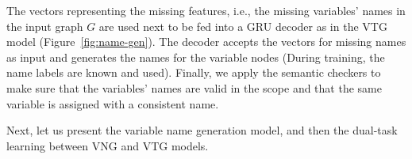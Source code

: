 The vectors representing the missing features, i.e., the missing
variables' names in the input graph $G$ are used next to be fed into a
GRU decoder as in the VTG model (Figure~\ref{fig:name-gen}). The
decoder accepts the vectors for missing names as input and generates
the names for the variable nodes (During training, the name labels are
known and used). Finally, we apply the semantic checkers to make sure
that the variables' names are valid in the scope and that the same
variable is assigned with a consistent name.



Next, let us present the variable name generation model, and then
the dual-task learning between VNG and VTG models.









